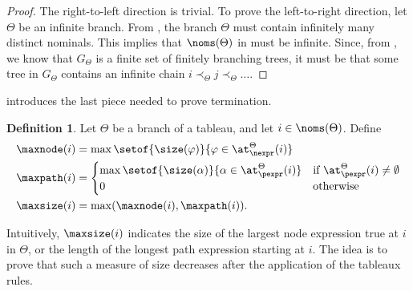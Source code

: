 \documentclass[10pt,a4paper]{amsart}
\theoremstyle{definition}
\newtheorem{defi}[thm]{Definition}
\theoremstyle{remark}
\begin{document}
\begin{proof}
  The right-to-left direction is trivial.
  To prove the left-to-right direction, let  $\Theta$ be an infinite branch.
  From , the branch $\Theta$ must contain infinitely many distinct nominals.
  This implies that $\noms(\Theta)$ in  must be infinite.
  Since, from , we know that $G_\Theta$ is a finite set of finitely branching trees, it must be that some tree in $G_\Theta$ contains an infinite chain $i \prec_\Theta j \prec_\Theta \dots $.
\end{proof}

 introduces the last piece needed to prove termination.

\begin{defi}\label{def:maxsize}
  Let $\Theta$ be a branch of a tableau, and let $i \in \noms(\Theta)$. Define
  \begin{align*}
    \maxnode(i) & = 
      \max\setof{ \size(\varphi)}{ \varphi \in \at^\Theta_{\nexpr}(i) } \\
    \maxpath(i) &=
      \begin{cases}
        \max\setof{\size(\alpha)}{\alpha \in \at^{\Theta}_{\pexpr}(i)} & \text{if } \at^{\Theta}_{\pexpr}(i) \neq \emptyset \\
        0 & \text{otherwise}\\
      \end{cases}\\
    \maxsize(i)
& = \max (\maxnode(i) , \maxpath(i)).
  \end{align*}
\end{defi}

Intuitively, $ \maxsize(i)$ indicates the size of the largest node expression true at $i$ in $\Theta$, or the length of the longest path expression starting at $i$.
The idea is to prove that such a measure of size decreases after the application of the tableaux rules. 
\end{document}

